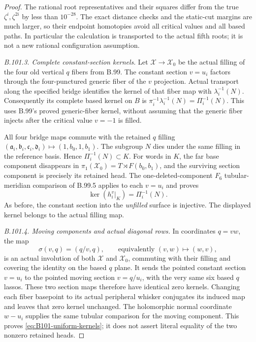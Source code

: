 \begin{proof}
The rational root representatives and their squares differ from the
true $\zeta^i,\zeta^{2i}$ by less than $10^{-28}$.
The exact distance checks and the static-cut margins are much larger,
so their endpoint homotopies avoid all critical values and all
based paths.  In particular the calculation is transported to the
actual fifth roots; it is not a new rational configuration assumption.

\emph{B.101.3. Complete constant-section kernels.}
Let $\mathscr X\to\mathscr X_0$ be the actual filling of the four
old vertical $q$ fibers from B.99.
The constant section $v=u_i$ factors through the four-punctured
generic fiber of the $v$ projection.  Actual transport along the
specified bridge identifies the kernel of that fiber map with
$\lambda_i^{-1}(N)$.
Consequently its complete based kernel on $B$ is
$\pi_i^{-1}\lambda_i^{-1}(N)=\Pi_i^{-1}(N)$.
This uses B.99's proved generic-fiber kernel, without assuming that
the generic fiber injects after the critical value $v=-1$ is filled.

All four bridge maps commute with the retained $q$ filling
$(\mathfrak{a}_i,\mathfrak{b}_i,\mathfrak{c}_i,\mathfrak{d}_i)\mapsto(1,b_0,1,b_1)$.
The subgroup $N$ dies under the same filling in the reference basis.
Hence $\Pi_i^{-1}(N)\subset K$.
For words in $K$, the far base component disappears in
$\pi_1(\mathscr X_0)=T\rtimes F(b_0,b_1)$, and the surviving
section component is precisely its retained head.
The one-deleted-component $F_6$ tubular-meridian comparison of
B.99.5 applies to each $v=u_i$ and proves
\[
 \ker(h_i^v|_K)=\Pi_i^{-1}(N).
\]
As before, the constant section into the \emph{unfilled} surface
is injective.  The displayed kernel belongs to the actual filling map.

\emph{B.101.4. Moving components and actual diagonal rows.}
In coordinates $q=vw$, the map
\begin{equation}\label{eq:B101-swap}
 \sigma(v,q)=(q/v,q),\qquad\text{equivalently }(v,w)\mapsto(w,v),
\end{equation}
is an actual involution of both $\mathscr X$ and $\mathscr X_0$,
commuting with their filling and covering the identity on the based
$q$ plane.  It sends the pointed constant section $v=u_i$ to the
pointed moving section $v=q/u_i$, with the very same six based $q$ lassos.
These two section maps therefore have identical zero kernels.
Changing each fiber basepoint to its actual peripheral whisker
conjugates its induced map and leaves that zero kernel unchanged.
The holomorphic normal coordinate $w-u_i$ supplies the same tubular
comparison for the moving component.
This proves \eqref{eq:B101-uniform-kernels}; it does not assert
literal equality of the two nonzero retained heads.


\end{proof}
